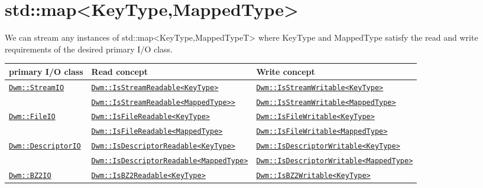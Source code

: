 \begin{minipage}{\textwidth}
\section{\ttfamily std::map<KeyType,MappedType>}
We can stream any instances of {\ttfamily std::map<KeyType,MappedTypeT>}
where {\ttfamily KeyType} and {\ttfamily MappedType} satisfy the read and
write requirements of the desired primary I/O class.
\vspace{1ex}

\begin{small}
\begin{tabular}{lll}
\textbf{primary I/O class} & \textbf{Read concept} & \textbf{Write concept} \\ \hline
\multirow{2}{*}{\hyperref[section:DwmStreamIOClass]{\texttt{Dwm::StreamIO}}} & \hyperref[concept:DwmIsStreamReadable]{\texttt{Dwm::IsStreamReadable<KeyType>}} & \hyperref[concept:DwmIsStreamWritable]{\texttt{Dwm::IsStreamWritable<KeyType>}} \\
 & \hyperref[concept:DwmIsStreamReadable]{\texttt{Dwm::IsStreamReadable<MappedType>>}} & \hyperref[concept:DwmIsStreamWritable]{\texttt{Dwm::IsStreamWritable<MappedType>}} \\ \hline
\multirow{2}{*}{\hyperref[section:DwmFileIOClass]{\texttt{Dwm::FileIO}}} & \hyperref[concept:DwmIsFileReadable]{\texttt{Dwm::IsFileReadable<KeyType>}} & \hyperref[concept:DwmIsFileWritable]{\texttt{Dwm::IsFileWritable<KeyType>}} \\
 & \hyperref[concept:DwmIsFileReadable]{\texttt{Dwm::IsFileReadable<MappedType>}} & \hyperref[concept:DwmIsFileWritable]{\texttt{Dwm::IsFileWritable<MappedType>}} \\ \hline
\multirow{2}{*}{\hyperref[section:DwmDescriptorIOClass]{\texttt{Dwm::DescriptorIO}}} & \hyperref[concept:DwmIsDescriptorReadable]{\texttt{Dwm::IsDescriptorReadable<KeyType>}} & \hyperref[concept:DwmIsDescriptorWritable]{\texttt{Dwm::IsDescriptorWritable<KeyType>}} \\
 & \hyperref[concept:DwmIsDescriptorReadable]{\texttt{Dwm::IsDescriptorReadable<MappedType>}} & \hyperref[concept:DwmIsDescriptorWritable]{\texttt{Dwm::IsDescriptorWritable<MappedType>}} \\ \hline
\multirow{2}{*}{\hyperref[section:DwmBZ2IOClass]{\texttt{Dwm::BZ2IO}}} & \hyperref[concept:DwmIsBZ2Readable]{\texttt{Dwm::IsBZ2Readable<KeyType>}} & \hyperref[concept:DwmIsBZ2Writable]{\texttt{Dwm::IsBZ2Writable<KeyType>}} \\

\end{tabular}
\end{small}
\end{minipage}
